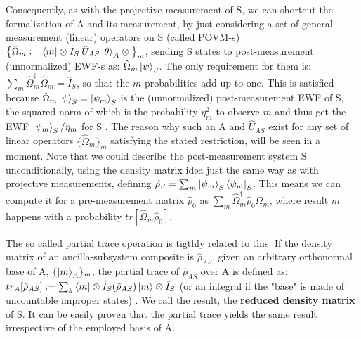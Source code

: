 \documentclass[11pt, a4paper]{article} %
\begin{document}
Consequently, as with the projective measurement of S, we can shortcut the formalization of A and its measurement, by just considering a set of general measurement (linear) operators on S (called POVM-s) $\big\{\hat{\Omega}_m:=\bra{m}\otimes\hat{I}_S\:\hat{U}_{AS}\ket{\theta}_A\otimes\big\}_m$, sending S states to post-measurement (unnormalized) EWF-s as: $\hat{\Omega}_m\ket{\psi}_S$. The only requirement for them is: $\sum_m \hat{\Omega}_m^\dagger\hat{\Omega}_m=\hat{I}_S$, so that the $m$-probabilities add-up to one. This is satisfied because $\hat{\Omega}_m\ket{\psi}_S=\ket{\psi_m}_S$ is the (unnormalized) post-measurement EWF of S, the squared norm of which is the probability $\eta_m^2$ to observe $m$ and thus get the EWF $\ket{\psi_m}_S/\eta_m$ for S \cite{Generalized, Durr}. The reason why such an A and $\hat{U}_{AS}$  exist for any set of linear operators $\{\hat{\Omega}_m\}_m$ satisfying the stated restriction, will be seen in a moment. Note that we could describe the post-measurement system S unconditionally, using the density matrix idea just the same way as with projective measurements, defining $\hat{\rho}_S=\sum_m \ket{\psi_m}_S\bra{\psi_m}_S$. This means we can compute it for a pre-measurement matrix $\hat{\rho}_0$ as $\sum_m \hat{\Omega}_m^\dagger \hat{\rho}_0 \hat{\Omega}_m$, where result $m$ happens with a probability $tr[\hat{\Omega}_m \hat{\rho}_0]$.

The so called partial trace operation is tigthly related to this. If the density matrix of an ancilla-subsystem composite is $\hat{\rho}_{AS}$, given an arbitrary orthonormal base of A, $\{\ket{m}_A\}_m$, the partial trace of $\hat{\rho}_{AS}$ over A is defined as: $tr_{A}[\hat{\rho}_{AS}] := \sum_k \bra{m}\otimes \hat{I}_S(\hat{\rho}_{AS})\ket{m}\otimes \hat{I}_S$ (or an integral if the "base" is made of uncountable improper states) \cite{Generalized, Durr}. We call the result, the {\bf reduced density matrix} of S. It can be easily proven that the partial trace yields the same result irrespective of the employed basis of A.\vspace{-0.1cm}
\end{document}
